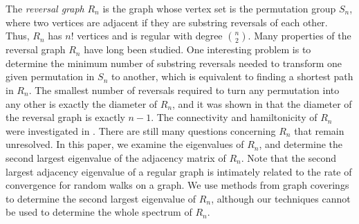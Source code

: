 The \textit{reversal graph} $R_n$ is the graph whose vertex set is the permutation group $S_n$, where
two vertices are adjacent if they are substring reversals of each other. Thus, $R_n$ has $n!$ vertices and is regular
with degree
$\binom {n} 2$.
Many properties of  the reversal graph $R_n$ have long been studied.
One interesting problem is to determine the minimum number of substring reversals needed to transform one
given permutation in $S_n$ to another, which is equivalent to finding 
a shortest path in $R_n$.  The smallest number of reversals required to turn any permutation into any other
is exactly the diameter of $R_n$, and 
it was shown in \cite{BafnaPevzner1996} that the diameter of 
the reversal graph is exactly $n-1$. The connectivity
and hamiltonicity of $R_n$ were investigated in \cite{LiMeng2008}. 
There are  still many questions concerning $R_n$ that remain unresolved. In this paper, we examine
 the eigenvalues of  $R_n$, and determine the second largest eigenvalue of the adjacency matrix of $R_n$.
 Note that the second largest adjacency eigenvalue of a regular graph is intimately related to the
 rate of convergence for random walks on a graph. We use methods from graph coverings to determine
 the second largest eigenvalue of $R_n$, although our techniques cannot be used to determine
 the whole spectrum of $R_n$.



